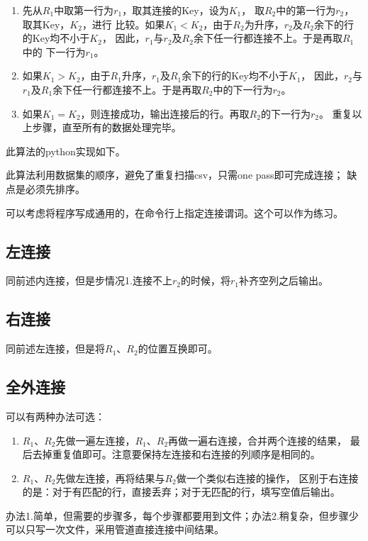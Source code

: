 \documentclass[11pt]{article}
\begin{document}
\begin{enumerate}
  \item 先从$R_1$中取第一行为$r_1$，取其连接的Key，设为$K_1$，
  取$R_2$中的第一行为$r_2$，取其Key，$K_2$，进行
比较。如果$K_1 < K_2$，由于$R_2$为升序，$r_2$及$R_2$余下的行的Key均不小于$K_2$，
因此，$r_1$与$r_2$及$R_2$余下任一行都连接不上。于是再取$R_1$中的
下一行为$r_1$。

  \item 如果$K_1 > K_2$，由于$R_1$升序，$r_1$及$R_1$余下的行的Key均不小于$K_1$，
  因此，$r_2$与$r_1$及$R_1$余下任一行都连接不上。于是再取$R_2$中的下一行为$r_2$。

  \item 如果$K_1 = K_2$，则连接成功，输出连接后的行。再取$R_2$的下一行为$r_2$。
重复以上步骤，直至所有的数据处理完毕。
\end{enumerate}
此算法的python实现如下。


此算法利用数据集的顺序，避免了重复扫描csv，只需one pass即可完成连接；
缺点是必须先排序。

可以考虑将程序写成通用的，在命令行上指定连接谓词。这个可以作为练习。

\subsection{左连接}
同前述内连接，但是步情况1.连接不上$r_2$的时候，将$r_1$补齐空列之后输出。

\subsection{右连接}
同前述左连接，但是将$R_1$、$R_2$的位置互换即可。

\subsection{全外连接}
可以有两种办法可选：
\begin{enumerate}
  \item $R_1$、$R_2$先做一遍左连接，$R_1$、$R_2$再做一遍右连接，合并两个连接的结果，
最后去掉重复值即可。注意要保持左连接和右连接的列顺序是相同的。

 \item $R_1$、$R_2$先做左连接，再将结果与$R_2$做一个类似右连接的操作，
区别于右连接的是：对于有匹配的行，直接丢弃；对于无匹配的行，填写空值后输出。
\end{enumerate}
办法1.简单，但需要的步骤多，每个步骤都要用到文件；办法2.稍复杂，但步骤少
可以只写一次文件，采用管道直接连接中间结果。
\end{document}
